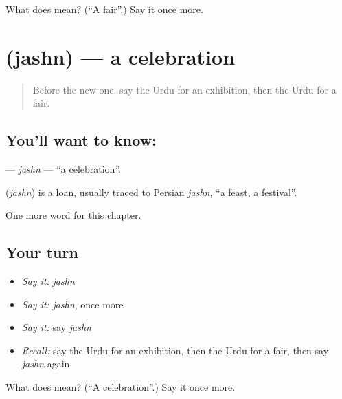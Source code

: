 \begin{tcolorbox}[breakable,colback=teal!4,colframe=teal!35!black,title={Before you move on}]
What does  mean? (\textquotedblleft{}A fair\textquotedblright{}.) Say it once more.
\end{tcolorbox}
\section[\texorpdfstring{\ur{جشن} (jashn)}{جشن (jashn)}]{ (jashn) — a celebration}

\label{lesson:UR-C169-jashn}



\begin{quote}
Before the new one: say the Urdu for an exhibition, then the Urdu for a fair.
\end{quote}

\subsection*{You'll want to know: }
\textbf{} — \emph{jashn} — \textquotedblleft{}a celebration\textquotedblright{}.

\begin{cousinweb}
\textbf{} (\emph{jashn}) is a loan, usually traced to Persian \emph{jashn}, \textquotedblleft{}a feast, a festival\textquotedblright{}.
\end{cousinweb}

\begin{grammarlens}[title={What you've built}]
One more word for this chapter.
\end{grammarlens}

\subsection*{Your turn}
\begin{itemize}
\raggedright
  \item \emph{Say it:} \emph{jashn}
  \item \emph{Say it:} \emph{jashn}, once more
  \item \emph{Say it:} say \emph{jashn}
  \item \emph{Recall:} say the Urdu for an exhibition, then the Urdu for a fair, then say \emph{jashn} again
\end{itemize}

\begin{tcolorbox}[breakable,colback=teal!4,colframe=teal!35!black,title={Before you move on}]
What does  mean? (\textquotedblleft{}A celebration\textquotedblright{}.) Say it once more.
\end{tcolorbox}
